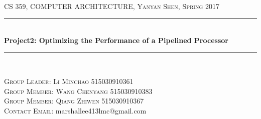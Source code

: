 \documentclass[12pt,a4paper]{article}
\theoremstyle{definition}
\numberwithin{equation}{section}
\numberwithin{figure}{section}
\begin{document}
	
\noindent
\begin{titlepage}
\begin{center}
\textbf{}\\[6cm]
\textsc{\normalsize CS 359, COMPUTER ARCHITECTURE, Yanyan Shen, Spring 2017}\\[0.7cm]
\rule{\linewidth}{1mm}\\[1cm]
\textbf{\large Project2: Optimizing the Performance of a Pipelined Processor}\\[1cm]
\rule{\linewidth}{1mm}\\[5cm]
\begin{flushleft}
\textsc{\small Group Leader:  Li Minchao     515030910361}\\[1cm]
\textsc{\small Group Member:  Wang Chenyang  515030910383}\\[1cm]
\textsc{\small Group Member:  Qiang Zhiwen   515030910367}\\[1cm]
\textsc{\small Contact Email:}  \small marshallee413lmc@gmail.com\\[1cm]
\end{flushleft}
\end{center}
\end{titlepage}



\end{document}
